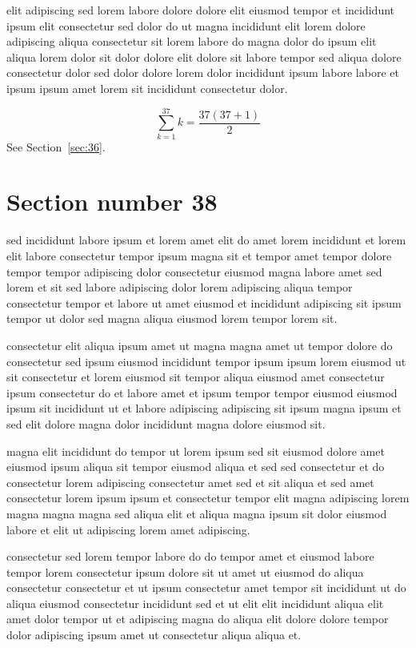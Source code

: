 \documentclass{article}
\begin{document}
elit adipiscing sed lorem labore dolore dolore elit eiusmod tempor et incididunt ipsum elit consectetur sed dolor do ut magna incididunt elit lorem dolore adipiscing aliqua consectetur sit lorem labore do magna dolor do ipsum elit aliqua lorem dolor sit dolor dolore elit dolore sit labore tempor sed aliqua dolore consectetur dolor sed dolor dolore lorem dolor incididunt ipsum labore labore et ipsum ipsum amet lorem sit incididunt consectetur dolor.

\begin{equation} \sum_{k=1}^{37} k = \frac{37(37+1)}{2} \end{equation}
See Section~\ref{sec:36}.

\section{Section number 38}\label{sec:38}
sed incididunt labore ipsum et lorem amet elit do amet lorem incididunt et lorem elit labore consectetur tempor ipsum magna sit et tempor amet tempor dolore tempor tempor adipiscing dolor consectetur eiusmod magna labore amet sed lorem et sit sed labore adipiscing dolor lorem adipiscing aliqua tempor consectetur tempor et labore ut amet eiusmod et incididunt adipiscing sit ipsum tempor ut dolor sed magna aliqua eiusmod lorem tempor lorem sit.

consectetur elit aliqua ipsum amet ut magna magna amet ut tempor dolore do consectetur sed ipsum eiusmod incididunt tempor ipsum ipsum lorem eiusmod ut sit consectetur et lorem eiusmod sit tempor aliqua eiusmod amet consectetur ipsum consectetur do et labore amet et ipsum tempor tempor eiusmod eiusmod ipsum sit incididunt ut et labore adipiscing adipiscing sit ipsum magna ipsum et sed elit dolore magna dolor incididunt magna dolore eiusmod sit.

magna elit incididunt do tempor ut lorem ipsum sed sit eiusmod dolore amet eiusmod ipsum aliqua sit tempor eiusmod aliqua et sed sed consectetur et do consectetur lorem adipiscing consectetur amet sed et sit aliqua et sed amet consectetur lorem ipsum ipsum et consectetur tempor elit magna adipiscing lorem magna magna magna sed aliqua elit et aliqua magna ipsum sit dolor eiusmod labore et elit ut adipiscing lorem amet adipiscing.

consectetur sed lorem tempor labore do do tempor amet et eiusmod labore tempor lorem consectetur ipsum dolore sit ut amet ut eiusmod do aliqua consectetur consectetur et ut ipsum consectetur amet tempor sit incididunt ut do aliqua eiusmod consectetur incididunt sed et ut elit elit incididunt aliqua elit amet dolor tempor ut et adipiscing magna do aliqua elit dolore dolore tempor dolor adipiscing ipsum amet ut consectetur aliqua aliqua et.
\end{document}
